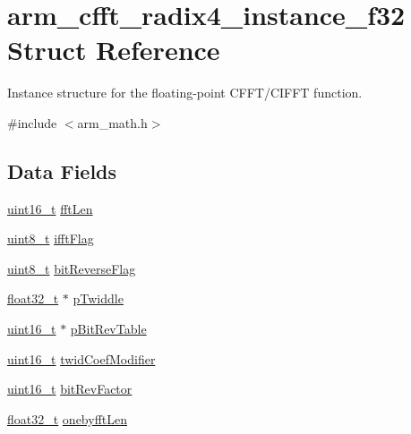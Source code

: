 \hypertarget{structarm__cfft__radix4__instance__f32}{\section{arm\-\_\-cfft\-\_\-radix4\-\_\-instance\-\_\-f32 Struct Reference}
\label{structarm__cfft__radix4__instance__f32}
}


Instance structure for the floating-\/point C\-F\-F\-T/\-C\-I\-F\-F\-T function.  




{\ttfamily \#include $<$arm\-\_\-math.\-h$>$}

\subsection*{Data Fields}
\begin{DoxyCompactItemize}
\item 
\hyperlink{stdint_8h_a273cf69d639a59973b6019625df33e30}{uint16\-\_\-t} \hyperlink{structarm__cfft__radix4__instance__f32_a7e6a6d290ce158ce9a15a45e364b021a}{fft\-Len}
\item 
\hyperlink{stdint_8h_aba7bc1797add20fe3efdf37ced1182c5}{uint8\-\_\-t} \hyperlink{structarm__cfft__radix4__instance__f32_a25d1da64dd6487c291f04d226f9acc66}{ifft\-Flag}
\item 
\hyperlink{stdint_8h_aba7bc1797add20fe3efdf37ced1182c5}{uint8\-\_\-t} \hyperlink{structarm__cfft__radix4__instance__f32_ac10927a1620195a88649ce63dab66120}{bit\-Reverse\-Flag}
\item 
\hyperlink{arm__math_8h_a4611b605e45ab401f02cab15c5e38715}{float32\-\_\-t} $\ast$ \hyperlink{structarm__cfft__radix4__instance__f32_a14860c7544911702ca1fa0bf78204ef3}{p\-Twiddle}
\item 
\hyperlink{stdint_8h_a273cf69d639a59973b6019625df33e30}{uint16\-\_\-t} $\ast$ \hyperlink{structarm__cfft__radix4__instance__f32_a8da0d2ca69749fde8cbb95caeac6fe6a}{p\-Bit\-Rev\-Table}
\item 
\hyperlink{stdint_8h_a273cf69d639a59973b6019625df33e30}{uint16\-\_\-t} \hyperlink{structarm__cfft__radix4__instance__f32_abe31ea2157dfa233e389cdfd3b9993ee}{twid\-Coef\-Modifier}
\item 
\hyperlink{stdint_8h_a273cf69d639a59973b6019625df33e30}{uint16\-\_\-t} \hyperlink{structarm__cfft__radix4__instance__f32_acc8cb18a8b901b8321ab9d86491e41a3}{bit\-Rev\-Factor}
\item 
\hyperlink{arm__math_8h_a4611b605e45ab401f02cab15c5e38715}{float32\-\_\-t} \hyperlink{structarm__cfft__radix4__instance__f32_ab9eed39e40b8d7c16381fbccf84467cd}{onebyfft\-Len}
\end{DoxyCompactItemize}


